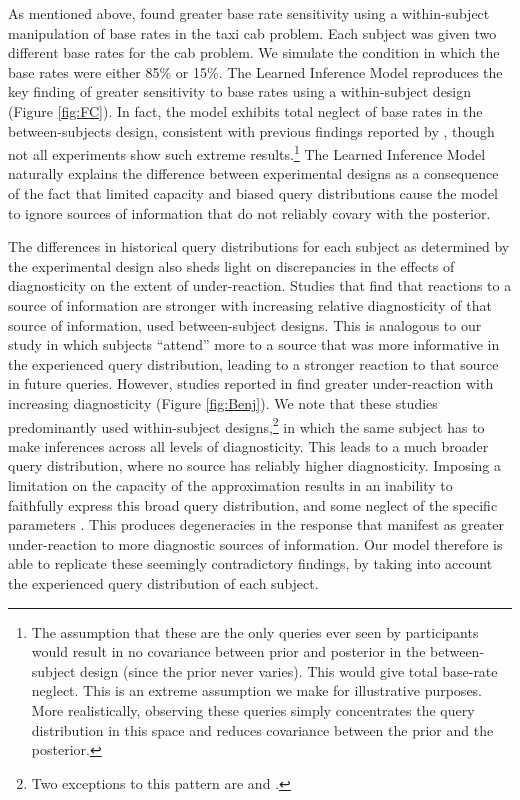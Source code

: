 As mentioned above, \citet{fischhoff1979subjective} found greater base rate sensitivity using a within-subject manipulation of base rates in the taxi cab problem. Each subject was given two different base rates for the cab problem. We simulate the condition in which the base rates were either 85\% or 15\%. The Learned Inference Model reproduces the key finding of greater sensitivity to base rates using a within-subject design (Figure \ref{fig:FC}). In fact, the model exhibits total neglect of base rates in the between-subjects design, consistent with previous findings reported by \cite{lyon1976dominance}, though not all experiments show such extreme results.\footnote{The assumption that these are the only queries ever seen by participants would result in no covariance between prior and posterior in the between-subject design (since the prior never varies). This would give total base-rate neglect. This is an extreme assumption we make for illustrative purposes. More realistically, observing these queries simply concentrates the query distribution in this space and reduces covariance between the prior and the posterior.} The Learned Inference Model naturally explains the difference between experimental designs as a consequence of the fact that limited capacity and biased query distributions cause the model to ignore sources of information that do not reliably covary with the posterior.

The differences in historical query distributions for each subject as determined by the experimental design also sheds light on discrepancies in the effects of diagnosticity on the extent of under-reaction. Studies that find that reactions to a source of information are stronger with increasing relative diagnosticity \citep{bar1980base, fischhoff1984diagnosticity, ofir1988pseudodiagnosticity} of that source of information, used between-subject designs. This is analogous to our study in which subjects ``attend'' more to a source that was more informative in the experienced query distribution, leading to a stronger reaction to that source in future queries. However, studies reported in \cite{benjamin18} find greater under-reaction with increasing diagnosticity (Figure \ref{fig:Benj}). We note that these studies predominantly used within-subject designs,\footnote{Two exceptions to this pattern are \cite{sasaki2007belief} and \cite{beach1970sample}.} in which the same subject has to make inferences across all levels of diagnosticity. This leads to a much broader query distribution, where no source has reliably higher diagnosticity. Imposing a limitation on the capacity of the approximation results in an inability to faithfully express this broad query distribution, and some neglect of the specific parameters \citep{massey2005detecting}. This produces degeneracies in the response that manifest as greater under-reaction to more diagnostic sources of information. Our model therefore is able to replicate these seemingly contradictory findings, by taking into account the experienced query distribution of each subject.

